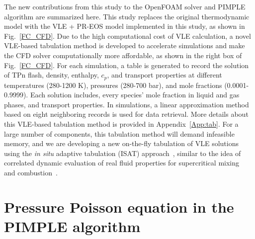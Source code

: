The new contributions from this study to the OpenFOAM solver and PIMPLE algorithm are summarized here. This study replaces the original thermodynamic model with the VLE + PR-EOS model implemented in this study, as shown in Fig.~\ref{FC_CFD}. Due to the high computational cost of VLE calculation, a novel VLE-based tabulation method is developed to accelerate simulations and make the CFD solver computationally more affordable, as shown in the right box of Fig.~\ref{FC_CFD}. For each simulation, a table is generated to record the solution of TPn flash, density, enthalpy, $c_p$, and transport properties at different temperatures (280-1200 K), pressures (280-700 bar), and  mole fractions (0.0001-0.9999). Each solution includes, every species' mole fraction in liquid and gas phases, and transport properties. In simulations, a linear approximation method based on eight neighboring records is used for data retrieval. More details about this VLE-based tabulation method is provided in Appendix~\ref{App:tab}. For a large number of components, this tabulation method will demand infeasible memory, and we are developing a new on-the-fly tabulation of VLE solutions using the \textit{in situ} adaptive tabulation (ISAT) approach~\cite{zhang2021multi}, similar to the idea of correlated dynamic evaluation of real fluid properties for supercritical mixing~\cite{yang2017comparison} and combustion~\cite{milan2019time}.

\section{Pressure Poisson equation in the PIMPLE algorithm} \label{App:gp}
    
